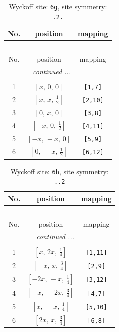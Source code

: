 \documentclass[fleqn,8pt]{jsarticle}
\begin{document}
\renewcommand{\arraystretch}{1.2}
\begin{longtable}{ccc}
\caption{Wyckoff site: {\tt 6g}, site symmetry: {\tt .2.}}
 \\
 \hline \hline
No. & position & mapping \\ \hline \endfirsthead

\multicolumn{2}{l}{\tablename\ \thetable{}} \\
 \hline \hline
No. & position & mapping \\ \hline \endhead

 \hline \hline
\multicolumn{2}{r}{\footnotesize\it continued ...} \\ \endfoot

 \hline \hline
\multicolumn{2}{r}{} \\ \endlastfoot

1 & $\left[ x,\, 0,\, 0 \right]$ & {\tt [1,7]} \\ \hline
2 & $\left[ x,\, x,\, \frac{1}{2} \right]$ & {\tt [2,10]} \\ \hline
3 & $\left[ 0,\, x,\, 0 \right]$ & {\tt [3,8]} \\ \hline
4 & $\left[ - x,\, 0,\, \frac{1}{2} \right]$ & {\tt [4,11]} \\ \hline
5 & $\left[ - x,\, - x,\, 0 \right]$ & {\tt [5,9]} \\ \hline
6 & $\left[ 0,\, - x,\, \frac{1}{2} \right]$ & {\tt [6,12]} \\
\end{longtable}
\renewcommand{\arraystretch}{1.2}
\begin{longtable}{ccc}
\caption{Wyckoff site: {\tt 6h}, site symmetry: {\tt ..2}}
 \\
 \hline \hline
No. & position & mapping \\ \hline \endfirsthead

\multicolumn{2}{l}{\tablename\ \thetable{}} \\
 \hline \hline
No. & position & mapping \\ \hline \endhead

 \hline \hline
\multicolumn{2}{r}{\footnotesize\it continued ...} \\ \endfoot

 \hline \hline
\multicolumn{2}{r}{} \\ \endlastfoot

1 & $\left[ x,\, 2 x,\, \frac{1}{4} \right]$ & {\tt [1,11]} \\ \hline
2 & $\left[ - x,\, x,\, \frac{3}{4} \right]$ & {\tt [2,9]} \\ \hline
3 & $\left[ - 2 x,\, - x,\, \frac{1}{4} \right]$ & {\tt [3,12]} \\ \hline
4 & $\left[ - x,\, - 2 x,\, \frac{3}{4} \right]$ & {\tt [4,7]} \\ \hline
5 & $\left[ x,\, - x,\, \frac{1}{4} \right]$ & {\tt [5,10]} \\ \hline
6 & $\left[ 2 x,\, x,\, \frac{3}{4} \right]$ & {\tt [6,8]} \\
\end{longtable}
\end{document}
